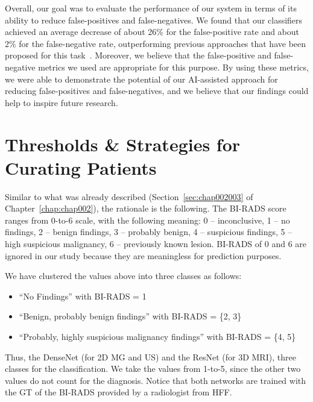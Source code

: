 Overall, our goal was to evaluate the performance of our system in terms of its ability to reduce false-positives and false-negatives.
We found that our classifiers achieved an average decrease of about 26\% for the false-positive rate and about 2\% for the false-negative rate, outperforming previous approaches that have been proposed for this task~\cite{CALISTO2022102285}.
Moreover, we believe that the false-positive and false-negative metrics we used are appropriate for this purpose.
By using these metrics, we were able to demonstrate the potential of our \ac{AI}-assisted approach for reducing false-positives and false-negatives, and we believe that our findings could help to inspire future research.

\section{Thresholds \& Strategies for Curating Patients}
\label{sec:app005014}

Similar to what was already described (Section~\ref{sec:chap002003} of Chapter~\ref{chap:chap002}), the rationale is the following.
The \ac{BI-RADS} score ranges from 0-to-6 scale, with the following meaning:
0 -- inconclusive,
1 -- no findings,
2 -- benign findings,
3 -- probably benign,
4 -- suspicious findings,
5 -- high suspicious malignancy,
6 -- previously known lesion.
\ac{BI-RADS} of 0 and 6 are ignored in our study because they are meaningless for prediction purposes.

\vspace{1.00mm}

\noindent
We have clustered the values above into three classes as follows:

\vspace{0.05mm}

\begin{itemize}
\item ``No Findings'' with \ac{BI-RADS} = 1
\item ``Benign, probably benign findings'' with \ac{BI-RADS} = \{2, 3\}
\item ``Probably, highly suspicious malignancy findings'' with \ac{BI-RADS} = \{4, 5\}
\end{itemize}

Thus, the  DenseNet (for 2D \ac{MG} and \ac{US}) and the ResNet (for 3D \ac{MRI}), three classes for the classification.
We take the values from 1-to-5, since the other two values do not count for the diagnosis.
Notice that both networks are trained with the \ac{GT} of the \ac{BI-RADS} provided by a radiologist from \ac{HFF}.

